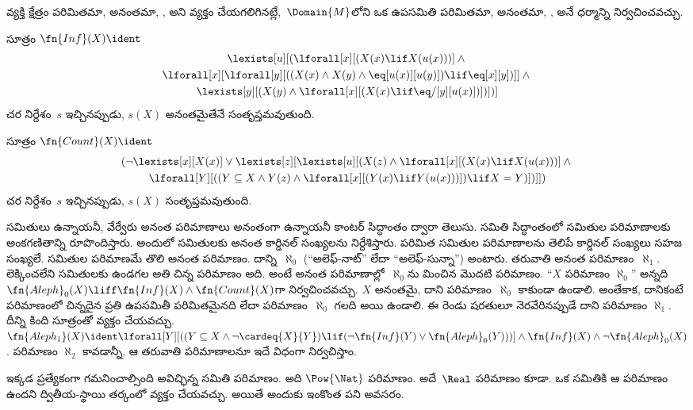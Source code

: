 \documentclass[../../../include/open-logic-section]{subfiles}
\begin{document}


\begin{explain}
వ్యక్తి క్షేత్రం పరిమితమా, అనంతమా,
,  అని
వ్యక్తం చేయగలిగినట్లే,~$\Domain{M}$లోని ఒక ఉపసమితి పరిమితమా,
అనంతమా, ,
 అనే ధర్మాన్ని నిర్వచించవచ్చు.
\end{explain}

\begin{prop}
సూత్రం $\fn{Inf}(X) \ident$
\begin{multline*}
\lexists[u][(\lforall[x][(X(x) \lif X(u(x)))] \land {} \\
  \lforall[x][\lforall[y][((X(x) \land X(y) \land
      \eq[u(x)][u(y)]) \lif \eq[x][y])]] \land {} \\
  \lexists[y][(X(y) \land \lforall[x][(X(x)
      \lif \eq/[y][u(x)])])])]
\end{multline*}
చర నిర్దేశం~$s$ ఇచ్చినప్పుడు, $s(X)$ అనంతమైతేనే సంతృప్తమవుతుంది.
\end{prop}

\begin{prop}
సూత్రం $\fn{Count}(X) \ident $
\begin{multline*}
(\lnot \lexists[x][X(x)] \lor
\lexists[z][\lexists[u][(X(z) \land
    \lforall[x][(X(x) \lif X(u(x)))] \land {} \\
    \lforall[Y][((Y \subseteq X \land Y(z) \land
      \lforall[x][(Y(x) \lif Y(u(x)))]) \lif X = Y)])]])
\end{multline*}
చర నిర్దేశం~$s$ ఇచ్చినప్పుడు, $s(X)$
 సంతృప్తమవుతుంది.
\end{prop}

 సమితులు ఉన్నాయనీ, వేర్వేరు అనంత పరిమాణాలు
అనంతంగా ఉన్నాయనీ కాంటర్ సిద్ధాంతం ద్వారా తెలుసు. సమితి సిద్ధాంతంలో
సమితుల పరిమాణాలకు అంకగణితాన్ని రూపొందిస్తారు. అందులో సమితులకు అనంత కార్డినల్ సంఖ్యలను
నిర్దేశిస్తారు. పరిమిత సమితుల పరిమాణాలను తెలిపే కార్డినల్ సంఖ్యలు
సహజ సంఖ్యలే.  సమితుల పరిమాణమే
తొలి అనంత పరిమాణం. దాన్ని~$\aleph_0$ (“అలెఫ్-నాట్” లేదా
“అలెఫ్-సున్నా”) అంటారు. తరువాతి అనంత పరిమాణం~$\aleph_1$.
లెక్కించలేని సమితులకు ఉండగల అతి చిన్న పరిమాణం అది. అంటే అనంత
పరిమాణాల్లో~$\aleph_0$ను మించిన మొదటి పరిమాణం. “$X$ పరిమాణం $\aleph_0$” అన్నది
$\fn{Aleph}_0(X) \liff \fn{Inf}(X) \land \fn{Count}(X)$గా నిర్వచించవచ్చు.
$X$ అనంతమై, దాని పరిమాణం~$\aleph_0$ కాకుండా ఉండాలి. అంతేకాక,
దానికంటే పరిమాణంలో చిన్నదైన ప్రతి ఉపసమితీ పరిమితమైనది లేదా
పరిమాణం~$\aleph_0$ గలది అయి ఉండాలి. ఈ రెండు షరతులూ
నెరవేరినప్పుడే దాని పరిమాణం $\aleph_1$. దీన్ని కింది సూత్రంతో
వ్యక్తం చేయవచ్చు.
$\fn{Aleph_1}(X) \ident \lforall[Y][((Y \subseteq X \land
  \lnot \cardeq{X}{Y}) \lif (\lnot\fn{Inf}(Y) \lor
  \fn{Aleph}_0(Y)))] \land \fn{Inf}(X) \land \lnot
\fn{Aleph}_0(X)$.
పరిమాణం $\aleph_2$ కావడాన్నీ, ఆ తరువాతి పరిమాణాలనూ ఇదే విధంగా నిర్వచిస్తాం.

ఇక్కడ ప్రత్యేకంగా గమనించాల్సింది అవిచ్ఛిన్న సమితి పరిమాణం.
అది $\Pow{\Nat}$ పరిమాణం. అదే~$\Real$ పరిమాణం కూడా.
ఒక సమితికి ఆ పరిమాణం ఉందని ద్వితీయ-స్థాయి తర్కంలో వ్యక్తం
చేయవచ్చు. అయితే అందుకు ఇంకొంత పని అవసరం.
\end{document}
